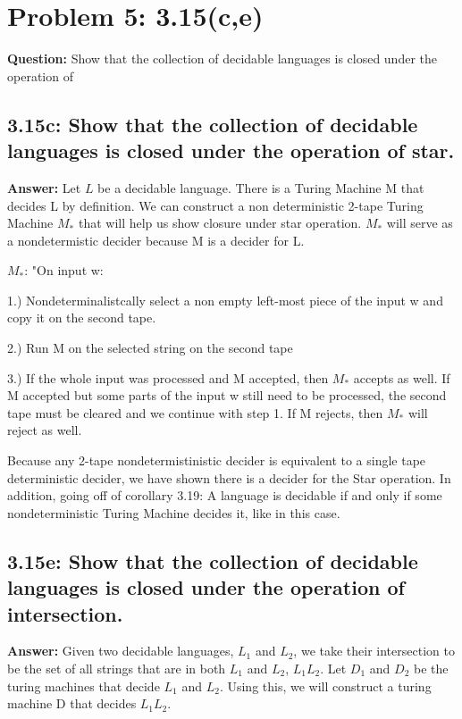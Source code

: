 \documentclass[12pt]{article}
\begin{document}
\section*{Problem 5: 3.15(c,e)}
{\bfseries Question:} Show that the collection of decidable languages is closed under the operation of

\subsection*{3.15c: Show that the collection of decidable languages is closed under the operation of star.}
{\bfseries Answer:} Let $L$ be a decidable language. There is a Turing Machine M that decides L by definition. We can construct a non deterministic 2-tape Turing Machine $M_*$ that will help us show closure under star operation. $M_*$ will serve as a nondetermistic decider because M is a decider for L. 

$M_*$: "On input w:

1.) Nondeterminalistcally select a non empty left-most piece of the input w and copy it on the second tape.

2.) Run M on the selected string on the second tape

3.) If the whole input was processed and M accepted, then $M_*$ accepts as well. If M accepted but some parts of the input w still need to be processed, the second tape must be cleared and we continue with step 1. If M rejects, then $M_*$ will reject as well.

Because any 2-tape nondetermistinistic decider is equivalent to a single tape deterministic decider, we have shown there is a decider for the Star operation. In addition, going off of corollary 3.19: A language is decidable if and only if some nondeterministic Turing Machine decides it, like in this case.

\subsection*{3.15e: Show that the collection of decidable languages is closed under the operation of intersection.}
{\bfseries Answer:} Given two decidable languages, $L_1$ and $L_2$, we take their intersection to be the set of all strings that are in both $L_1$ and $L_2$, $L_1$\cap$L_2$. Let $D_1$ and $D_2$ be the turing machines that decide $L_1$ and $L_2$. Using this, we will construct a turing machine D that decides $L_1$\cap$L_2$.
\end{document}
